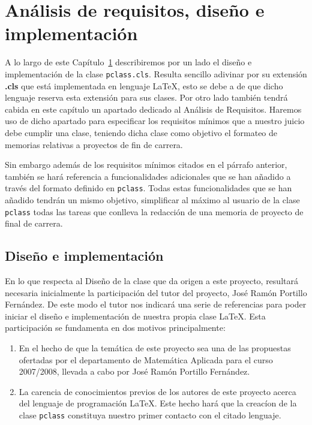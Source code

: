 \chapter{An\'alisis de requisitos, dise\~no e implementaci\'on}\label{requisitos}

A lo largo de este Cap\'itulo~\ref{requisitos} describiremos por un lado el dise\~no e implementaci\'on de la clase \texttt{pclass.cls}. Resulta sencillo adivinar por su extensi\'on \textbf{.cls} que est\'a implementada en lenguaje \LaTeX{}, esto se debe a de que dicho lenguaje reserva esta extensi\'on para sus clases.
Por otro lado tambi\'en tendr\'a cabida en este cap\'itulo un apartado dedicado al An\'alisis de Requisitos. Haremos uso
de dicho apartado para especificar los requisitos m\'inimos que a nuestro juicio debe cumplir una clase, teniendo dicha
clase como objetivo el formateo de memorias relativas a proyectos de fin de carrera. 

Sin embargo adem\'as de los requisitos m\'inimos citados en el p\'arrafo anterior, tambi\'en se har\'a referencia a funcionalidades adicionales que se han a\~nadido a trav\'es del formato definido en \texttt{pclass}. Todas estas 
funcionalidades que se han a\~nadido tendr\'an un mismo objetivo, simplificar al m\'aximo al usuario de la clase \texttt{pclass} todas las tareas que conlleva la redacci\'on de una memoria de proyecto de final de carrera. 
\\



\section{Dise\~no e implementaci\'on}
En lo que respecta al Dise\~no de la clase que da origen a este proyecto, resultar\'a necesaria inicialmente la 
participaci\'on del tutor del proyecto, Jos\'e Ram\'on Portillo Fern\'andez. De este modo el tutor nos indicar\'a una serie 
de referencias para poder iniciar el dise\~no e implementaci\'on de nuestra propia clase \LaTeX{}. Esta participaci\'on  se fundamenta en dos motivos principalmente:

\begin{enumerate}
	
	\item En el hecho de que la tem\'atica de este proyecto sea una de las propuestas ofertadas por el departamento de
				Matem\'atica Aplicada para el curso 2007/2008, llevada a cabo por Jos\'e Ram\'on Portillo Fern\'andez.

	\item La carencia de conocimientos previos de los autores de este proyecto acerca del lenguaje de programaci\'on \LaTeX{}.
				Este hecho har\'a que la creac\'ion de la clase \texttt{pclass} constituya nuestro primer contacto con el citado	
			  lenguaje.

\end{enumerate}

